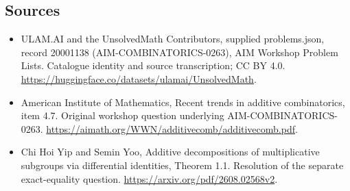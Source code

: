 \documentclass[11pt,a4paper]{article}
\begin{document}
\subsection{Sources}
\begin{itemize}
\item[S1] ULAM.AI and the UnsolvedMath Contributors, supplied problems.json, record 20001138 (AIM-COMBINATORICS-0263), AIM Workshop Problem Lists. Catalogue identity and source transcription; CC BY 4.0.
\url{https://huggingface.co/datasets/ulamai/UnsolvedMath}.
\item[S2] American Institute of Mathematics, Recent trends in additive combinatorics, item 4.7. Original workshop question underlying AIM-COMBINATORICS-0263.
\url{https://aimath.org/WWN/additivecomb/additivecomb.pdf}.
\item[S3] Chi Hoi Yip and Semin Yoo, Additive decompositions of multiplicative subgroups via differential identities, Theorem 1.1. Resolution of the separate exact-equality question.
\url{https://arxiv.org/pdf/2608.02568v2}.
\end{itemize}
\end{document}
